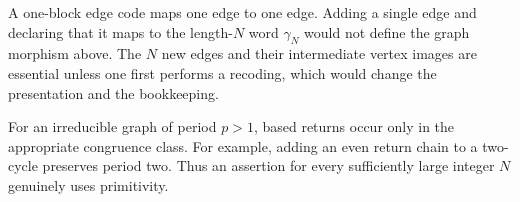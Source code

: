 \begin{remark}
A one-block edge code maps one edge to one edge.  Adding a single edge and
declaring that it maps to the length-$N$ word $\gamma_N$ would not define the
graph morphism above.  The $N$ new edges and their intermediate vertex images
are essential unless one first performs a recoding, which would change the
presentation and the bookkeeping.
\end{remark}

\begin{remark}
For an irreducible graph of period $p>1$, based returns occur only in the
appropriate congruence class.  For example, adding an even return chain to a
two-cycle preserves period two.  Thus an assertion for every sufficiently
large integer $N$ genuinely uses primitivity.
\end{remark}

